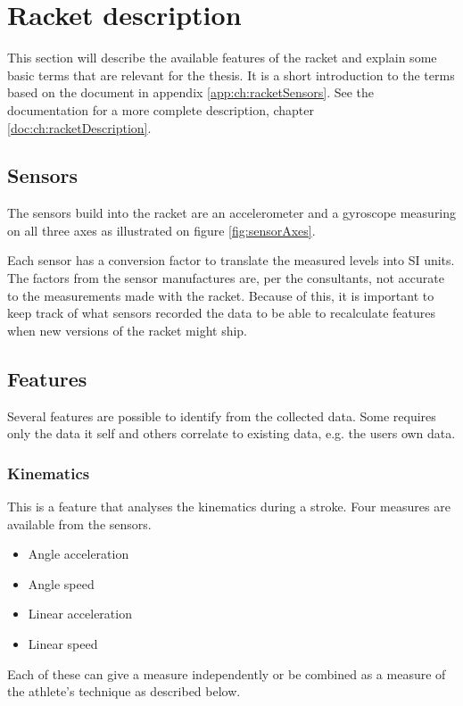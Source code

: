 \section{Racket description}
This section will describe the available features of the racket and explain some basic terms that are relevant for the thesis.
It is a short introduction to the terms based on the document in appendix \ref{app:ch:racketSensors}.
See the documentation for a more complete description, chapter \ref{doc:ch:racketDescription}.

\subsection{Sensors}
The sensors build into the racket are an accelerometer and a gyroscope measuring on all three axes as illustrated on figure \ref{fig:sensorAxes}.

Each sensor has a conversion factor to translate the measured levels into SI units.
The factors from the sensor manufactures are, per the consultants, not accurate to the measurements made with the racket.
Because of this, it is important to keep track of what sensors recorded the data to be able to recalculate features when new versions of the racket might ship.


\subsection{Features}
Several features are possible to identify from the collected data.
Some requires only the data it self and others correlate to existing data, e.g. the users own data.

\subsubsection*{Kinematics}
This is a feature that analyses the kinematics during a stroke.
Four measures are available from the sensors.

\begin{itemize}
    \item Angle acceleration
    \item Angle speed
    \item Linear acceleration
    \item Linear speed
\end{itemize}

Each of these can give a measure independently or be combined as a measure of the athlete's technique as described below.

